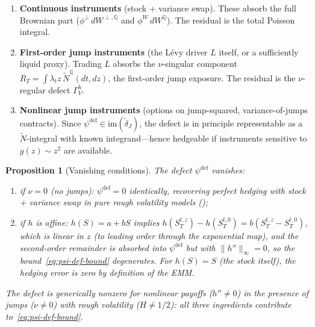 \documentclass[11pt,a4paper]{article}
\theoremstyle{plain}
\newtheorem{proposition}[theorem]{Proposition}
\theoremstyle{definition}
\theoremstyle{remark}
\newcommand{\QQ}{\mathbb{Q}}
\newcommand{\im}{\mathrm{im}}
\newcommand{\Ntilde}{\widetilde{N}}
\begin{document}
\begin{enumerate}[label=\textbf{Level \arabic*.}]
\item \textbf{Continuous instruments} (stock + variance swap).
  These absorb the full Brownian part
  ($\phi^\perp\,dW^{\perp,\QQ}$ and $\phi^W\,dW^\QQ$).
  The residual is the total Poisson integral.

\item \textbf{First-order jump instruments} (the L\'evy driver
  $L$ itself, or a sufficiently liquid proxy).  Trading $L$
  absorbs the $\nu$-singular component
  $R_T = \int\lambda_t z\,\Ntilde^\QQ(dt,dz)$, the
  first-order jump exposure.  The residual is the
  $\nu$-regular defect $\Gamma_V^h$.

\item \textbf{Nonlinear jump instruments} (options on
  jump-squared, variance-of-jumps contracts).  Since
  $\psi^{\mathrm{def}} \in \im(\widetilde{\delta}_J)$, the
  defect is in principle representable as a
  $\Ntilde$-integral with known integrand---hence hedgeable
  if instruments sensitive to $g(z) \sim z^2$ are available.
\end{enumerate}

\begin{proposition}[Vanishing conditions]\label{prop:vanishing}
The defect $\psi^{\mathrm{def}}$ vanishes:
\begin{enumerate}[label=(\alph*)]
\item if $\nu = 0$ (no jumps): $\psi^{\mathrm{def}} = 0$
  identically, recovering perfect hedging with stock +
  variance swap in pure rough volatility models
  (\cite{ElEuchRosenbaum2019,Fukasawa2021});
\item if $h$ is affine: $h(S) = a + bS$ implies
  $h(S_T^{t,z}) - h(S_T^{t,0}) = b(S_T^{t,z} - S_T^{t,0})$,
  which is linear in $z$ (to leading order through the
  exponential map), and the second-order remainder is
  absorbed into $\psi^{\mathrm{def}}$ but with
  $\|h''\|_\infty = 0$, so the bound~\eqref{eq:psi-def-bound}
  degenerates.  For $h(S) = S$ (the stock itself), the
  hedging error is zero by definition of the EMM.
\end{enumerate}
The defect is \emph{generically nonzero} for nonlinear payoffs
($h'' \neq 0$) in the presence of jumps ($\nu \neq 0$) with
rough volatility ($H \neq 1/2$): all three ingredients
contribute to~\eqref{eq:psi-def-bound}.
\end{proposition}
\end{document}
